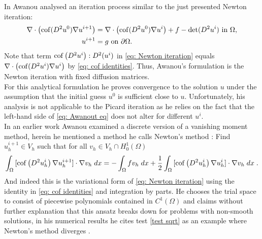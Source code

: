 In \cite{Awanou2014} Awanou analysed an iteration process similar to the just presented Newton iteration:
\begin{align}
	\nabla \cdot \left( \operatorname{cof}(D^2 u^0) \nabla u^{i+1} \right) &= \nabla \cdot \left( \operatorname{cof}(D^2 u^0) \nabla u^{i} \right) + f - \operatorname{det} (D^2u^i) \textnormal{ in } \Omega,  \label{eq: Awanout eq}\\
	u^{i+1} &= g \textnormal{ on } \partial \Omega.
\end{align}
Note that term $\operatorname{cof} \left( D^2 u^i \right):D^2(u^i)$ in \eqref{eq: Newton iteration} equals $\nabla \cdot \left( \operatorname{cof}(D^2 u^i) \nabla u^{i} \right)$ by \eqref{eq: cof identities}. Thus, Awanou's formulation is the Newton iteration with fixed diffusion matrices.\\
For this analytical formulation he proves convergence to the \MA solution $u$ under the assumption that the initial guess $u^0$ is sufficient close to $u$. Unfortunately, his analysis is not applicable to the Picard iteration as he relies on the fact that the left-hand side of \eqref{eq: Awanout eq} does not alter for different $u^i$.\\
In an earlier work \cite{Awanou2010} Awanou examined a discrete version of a vanishing moment method, herein he mentioned a method he calls Newton's method \cite[(1.3)]{Awanou2010}: Find $u_h^{i+1}\in V_h$ such that for all $v_h \in V_h \cap H^1_0 (\Omega)$
\[
	\int_{\Omega} {{[\operatorname{cof} \left(  D^2 u_h^i \right) \nabla u_h^{i+1}] \cdot \nabla v_h}\;dx} 
	= -	\int_{\Omega} {{f v_h}\;dx} 
		+ \frac 1 2 \int_{\Omega} {{[\operatorname{cof} \left(  D^2 u_h^i \right)  \nabla u_h^{i}] \cdot \nabla v_h}\;dx} \;  \label{eq: Awanout eq2}.
\]
And indeed this is the variational form of \eqref{eq: Newton iteration} using the identity in \eqref{eq: cof identities} and integration by parts.
He chooses the trial space to consist of piecewise polynomials contained in $C^1(\Omega)$ and claims without further explanation that this ansatz breaks down for problems with non-smooth solutions\cite[Introduction]{Awanou2010}, in his numerical results he cites test \ref{test sqrt} as an example where Newton's method diverges \cite[Section 4.4]{Awanou2010}.

